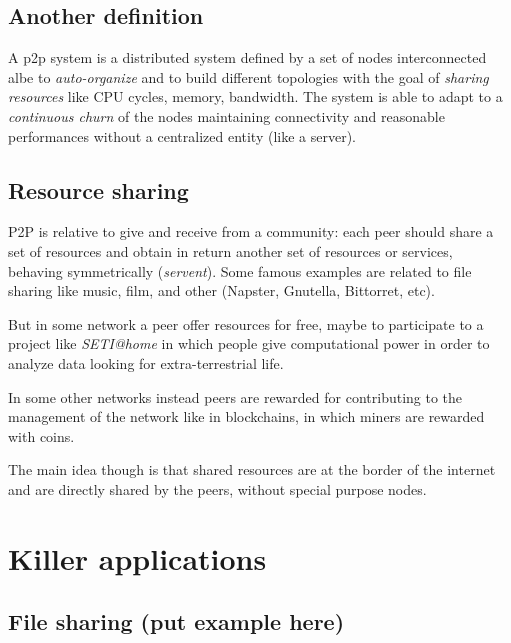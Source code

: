 \subsection{Another definition}
A p2p system is a distributed system defined by a set of nodes interconnected albe to \emph{auto-organize} and to build different topologies with the goal of \emph{sharing resources} like CPU cycles, memory, bandwidth.
The system is able to adapt to a \emph{continuous churn} of the nodes maintaining connectivity and reasonable performances without a centralized entity (like a server).

\subsection{Resource sharing}
P2P is relative to give and receive from a community: each peer should share a set of resources and obtain in return another set of resources or services, behaving symmetrically (\emph{servent}).
Some famous examples are related to file sharing like music, film, and other (Napster, Gnutella, Bittorret, etc).

But in some network a peer offer resources for free, maybe to participate to a project like \emph{SETI@home} in which people give computational power in order to analyze data looking for extra-terrestrial life.

In some other networks instead peers are rewarded for contributing to the management of the network like in blockchains, in which miners are rewarded with coins.

The main idea though is that shared resources are at the border of the internet and are directly shared by the peers, without special purpose nodes.

\section{Killer applications}

\subsection{File sharing (put example here)}

